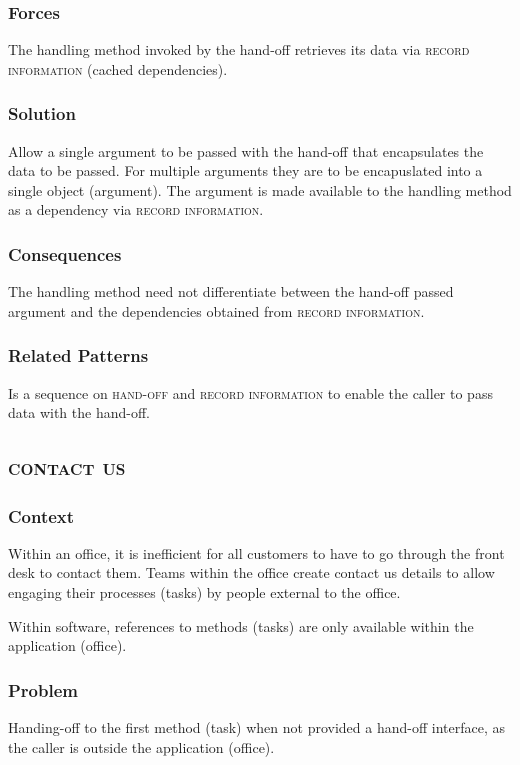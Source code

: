 \documentclass[prodmode]{style/acmlarge}
\begin{document}
\subsubsection*{Forces} The handling method invoked by the hand-off retrieves
its data via \textsc{record information} (cached dependencies).

\subsubsection*{Solution} Allow a single argument to be passed with the hand-off
that encapsulates the data to be passed.  For multiple arguments they are to be
encapuslated into a single object (argument).  The argument is made available to
the handling method as a dependency via \textsc{record information}.

\subsubsection*{Consequences} The handling method need not differentiate between
the hand-off passed argument and the dependencies obtained from \textsc{record
information}.

\subsubsection*{Related Patterns} Is a sequence on \textsc{hand-off} and
\textsc{record information} to enable the caller to pass data with the hand-off.



\subsection{\textsc{\textbf{contact us}}}

\subsubsection*{Context} Within an office, it is inefficient for all customers
to have to go through the front desk to contact them.  Teams within the office
create contact us details to allow engaging their processes (tasks) by people
external to the office.

Within software, references to methods (tasks) are only available within the
application (office).

\subsubsection*{Problem} Handing-off to the first method (task) when not
provided a hand-off interface, as the caller is outside the application
(office).
\end{document}
